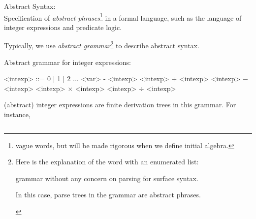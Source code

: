 \begin{enumcirc}
	\item
	Abstract Syntax: \\
	Specification of \emph{abstract phrases}\footnote{ vague words, but will be
		made rigorous when we define initial algebra. }
	in a formal language,
	such as the language of integer expressions and predicate logic.
	\item
	Typically, we use \emph{abstract grammar}\footnote{
		\begin{minipage}[t]{\textwidth}
			Here is the explanation of the word with an enumerated list:
			\begin{enumrm}
				\item
				grammar without any concern on parsing for surface syntax.
				\item
				In this case, parse trees in the grammar are abstract phrases.
			\end{enumrm}
		\end{minipage}
	}
	to describe abstract syntax.
	\item Abstract grammar for integer expressions: \setlength{\grammarindent}{6em} %
	\begin{center}
		\begin{minipage}{0.4\textwidth}
			\begin{grammar}
				<intexp> ::= 0 | 1 | 2 ...
				\alt <var>
				\alt - <intexp>
				\alt <intexp> $+$ <intexp>
				\alt <intexp> $-$ <intexp>
				\alt <intexp> $\times$ <intexp>
				\alt <intexp> $\div$ <intexp>
			\end{grammar}
		\end{minipage}
	\end{center}
	(abstract) integer expressions are finite derivation trees in this grammar.
	For instance,
	\begin{center}
		$\qquad$
		\begin{tikzpicture}[
				level 1/.style={sibling distance=20mm, level distance=10mm},
				level 2/.style={sibling distance=10mm},
				level 3/.style={sibling distance=5mm}]


\end{tikzpicture}
\end{center}
\end{enumcirc}
